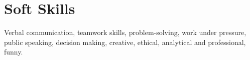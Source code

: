 \documentclass[letterpaper,11pt]{article}
\begin{document}
\section{Soft Skills}
\begin{itemize}[leftmargin=0.05in, label={}]
	\small{
	\item{Verbal communication, teamwork skills, problem-solving, work under pressure, public speaking, decision making, creative, ethical, analytical and professional, funny.}
	}
\end{itemize}

\end{document}
